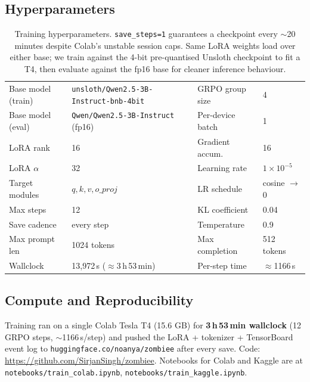 \documentclass[11pt,a4paper]{article}
\begin{document}
\subsection{Hyperparameters}
\begin{table}[h]
  \centering\small
  \begin{tabular}{ll|ll}
    \toprule
    Base model (train) & \texttt{unsloth/Qwen2.5-3B-Instruct-bnb-4bit} & GRPO group size & 4 \\
    Base model (eval)  & \texttt{Qwen/Qwen2.5-3B-Instruct} (fp16)      & Per-device batch & 1 \\
    LoRA rank          & 16                          & Gradient accum.  & 16 \\
    LoRA $\alpha$     & 32                          & Learning rate    & $1\!\times\!10^{-5}$ \\
    Target modules    & $q,k,v,o\_proj$             & LR schedule      & cosine $\rightarrow$ 0 \\
    Max steps         & 12                          & KL coefficient   & 0.04 \\
    Save cadence      & every step                  & Temperature      & 0.9 \\
    Max prompt len    & 1024 tokens                 & Max completion   & 512 tokens \\
    Wallclock         & 13{,}972\,s ($\approx$3\,h\,53\,min) & Per-step time & $\approx$1166\,s \\
    \bottomrule
  \end{tabular}
  \caption{Training hyperparameters. \texttt{save\_steps=1} guarantees a checkpoint
           every $\sim$20 minutes despite Colab's unstable session caps. Same LoRA
           weights load over either base; we train against the 4-bit pre-quantised
           Unsloth checkpoint to fit a T4, then evaluate against the fp16 base for
           cleaner inference behaviour.}
\end{table}

\subsection{Compute and Reproducibility}
Training ran on a single Colab Tesla T4 (15.6 GB) for
\textbf{3\,h\,53\,min wallclock} (12 GRPO steps, $\sim$1166\,s/step) and pushed
the LoRA + tokenizer + TensorBoard event log to
\texttt{huggingface.co/noanya/zombiee} after every save.
Code: \url{https://github.com/SirjanSingh/zombiee}. Notebooks for Colab and Kaggle
are at \texttt{notebooks/train\_colab.ipynb}, \texttt{notebooks/train\_kaggle.ipynb}.
\end{document}
